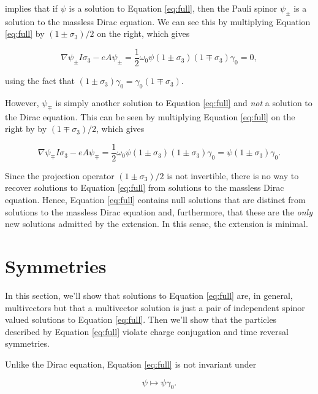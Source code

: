 \documentclass{article}
\begin{document}
  implies that if $\psi$ is a solution to Equation \ref{eq:full}, then the Pauli spinor $\psi_\pm$ is a solution to the massless Dirac equation. We can see this by multiplying Equation \ref{eq:full} by $(1 \pm \sigma_3)/2$ on the right, which gives

  \begin{equation}
    \nabla \psi_\pm I \sigma_3 - e A \psi_\pm = \frac{1}{2} \omega_0 \psi (1 \pm \sigma_3)(1 \mp \sigma_3) \gamma_0 = 0,
  \end{equation}

  using the fact that $(1 \pm \sigma_3) \gamma_0 = \gamma_0 (1 \mp \sigma_3)$.

  However, $\psi_\mp$ is simply another solution to Equation \ref{eq:full} and \emph{not} a solution to the Dirac equation. This can be seen by multiplying Equation \ref{eq:full} on the right by by $(1 \mp \sigma_3)/2$, which gives

  \begin{equation}
    \nabla \psi_\mp I \sigma_3 - e A \psi_\mp = \frac{1}{2} \omega_0 \psi(1 \pm \sigma_3)(1 \pm \sigma_3) \gamma_0 = \psi(1 \pm \sigma_3) \gamma_0.
  \end{equation}

  Since the projection operator $(1 \pm \sigma_3)/2$ is not invertible, there is no way to recover solutions to Equation \ref{eq:full} from solutions to the massless Dirac equation. Hence, Equation \ref{eq:full} contains null solutions that are distinct from solutions to the massless Dirac equation and, furthermore, that these are the \emph{only} new solutions admitted by the extension. In this sense, the extension is minimal.

  \section{Symmetries} \label{symmetries}

  In this section, we'll show that solutions to Equation \ref{eq:full} are, in general, multivectors but that a multivector solution is just a pair of independent spinor valued solutions to Equation \ref{eq:full}. Then we'll show that the particles described by Equation \ref{eq:full} violate charge conjugation and time reversal symmetries.

  Unlike the Dirac equation, Equation \ref{eq:full} is not invariant under

  \begin{equation}
    \psi \mapsto \psi \gamma_0.\label{eq:g0conjugation}
  \end{equation}
\end{document}
